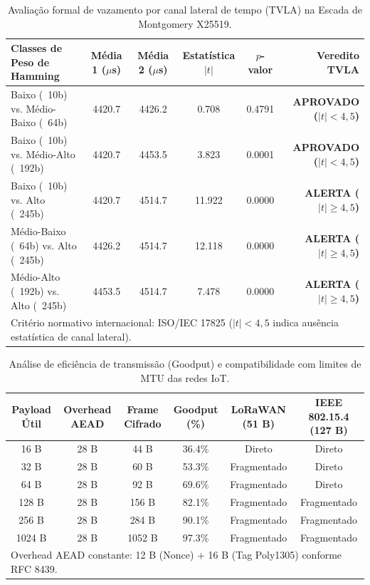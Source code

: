 \begin{table}[htbp]
\centering
\caption{Avaliação formal de vazamento por canal lateral de tempo (TVLA) na Escada de Montgomery X25519.}
\label{tab:tvla_welch_x25519}
\begin{tabular}{lccccr}
\hline
\textbf{Classes de Peso de Hamming} & \textbf{Média 1 ($\mu$s)} & \textbf{Média 2 ($\mu$s)} & \textbf{Estatística $|t|$} & \textbf{$p$-valor} & \textbf{Veredito TVLA} \\
\hline
Baixo (~10b) vs. Médio-Baixo (~64b) & 4420.7 & 4426.2 & 0.708 & 0.4791 & \textbf{APROVADO ($|t| < 4{,}5$)} \\
Baixo (~10b) vs. Médio-Alto (~192b) & 4420.7 & 4453.5 & 3.823 & 0.0001 & \textbf{APROVADO ($|t| < 4{,}5$)} \\
Baixo (~10b) vs. Alto (~245b) & 4420.7 & 4514.7 & 11.922 & 0.0000 & \textbf{ALERTA ($|t| \ge 4{,}5$)} \\
Médio-Baixo (~64b) vs. Alto (~245b) & 4426.2 & 4514.7 & 12.118 & 0.0000 & \textbf{ALERTA ($|t| \ge 4{,}5$)} \\
Médio-Alto (~192b) vs. Alto (~245b) & 4453.5 & 4514.7 & 7.478 & 0.0000 & \textbf{ALERTA ($|t| \ge 4{,}5$)} \\
\hline
\multicolumn{6}{l}{\footnotesize Critério normativo internacional: ISO/IEC 17825 ($|t| < 4{,}5$ indica ausência estatística de canal lateral).} \\
\end{tabular}
\end{table}

\begin{table}[htbp]
\centering
\caption{Análise de eficiência de transmissão (Goodput) e compatibilidade com limites de MTU das redes IoT.}
\label{tab:eficiencia_rede_iot}
\begin{tabular}{cccccc}
\hline
\textbf{Payload Útil} & \textbf{Overhead AEAD} & \textbf{Frame Cifrado} & \textbf{Goodput (\%)} & \textbf{LoRaWAN (51 B)} & \textbf{IEEE 802.15.4 (127 B)} \\
\hline
16 B & 28 B & 44 B & 36.4\% & Direto & Direto \\
32 B & 28 B & 60 B & 53.3\% & Fragmentado & Direto \\
64 B & 28 B & 92 B & 69.6\% & Fragmentado & Direto \\
128 B & 28 B & 156 B & 82.1\% & Fragmentado & Fragmentado \\
256 B & 28 B & 284 B & 90.1\% & Fragmentado & Fragmentado \\
1024 B & 28 B & 1052 B & 97.3\% & Fragmentado & Fragmentado \\
\hline
\multicolumn{6}{l}{\footnotesize Overhead AEAD constante: 12 B (Nonce) + 16 B (Tag Poly1305) conforme RFC 8439.} \\
\end{tabular}
\end{table}

